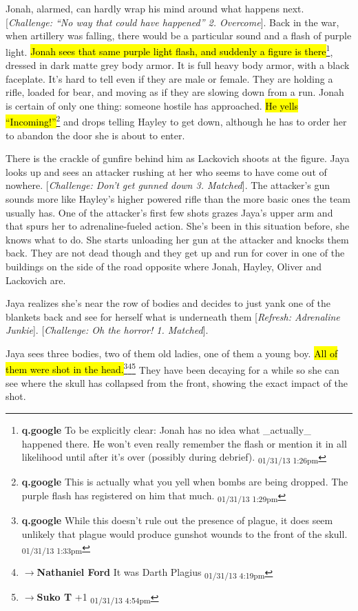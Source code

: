 Jonah, alarmed, can hardly wrap his mind around what happens next. {[}\textit{Challenge: ``No way that could have happened'' 2. Overcome}{]}.  Back in the war, when artillery was falling, there would be a particular sound and a flash of purple light.  \hl{Jonah sees that same purple light flash, and suddenly a figure is there}\footnote{\textbf{q.google }To be explicitly clear: Jonah has no idea what \_actually\_ happened there.  He won't even really remember the flash or mention it in all likelihood until after it's over (possibly during debrief). \textsubscript{01/31/13 1:26pm}}, dressed in dark matte grey body armor.  It is full heavy body armor, with a black faceplate.  It's hard to tell even if they are male or female. They are holding a rifle, loaded for bear, and moving as if they are slowing down from a run.  Jonah is certain of only one thing: someone hostile has approached.  \hl{He yells ``Incoming!''}\footnote{\textbf{q.google }This is actually what you yell when bombs are being dropped.  The purple flash has registered on him that much. \textsubscript{01/31/13 1:29pm}} and drops telling Hayley to get down, although he has to order her to abandon the door she is about to enter.



There is the crackle of gunfire behind him as Lackovich shoots at the figure.  Jaya looks up and sees an attacker rushing at her who seems to have come out of nowhere. {[}\textit{Challenge: Don't get gunned down 3. Matched}{]}.  The attacker's gun sounds more like Hayley's higher powered rifle than the more basic ones the team usually has.  One of the attacker's first few shots grazes Jaya's upper arm and that spurs her to adrenaline-fueled action.  She's been in this situation before, she knows what to do.  She starts unloading her gun at the attacker and knocks them back.  They are not dead though and they get up and run for cover in one of the buildings on the side of the road opposite where Jonah, Hayley, Oliver and Lackovich are.



Jaya realizes she's near the row of bodies and decides to just yank one of the blankets back and see for herself what is underneath them {[}\textit{Refresh: Adrenaline Junkie}{]}.  {[}\textit{Challenge: Oh the horror! 1.  Matched}{]}.  



Jaya sees three bodies, two of them old ladies, one of them a young boy.  \hl{All of them were shot in the head.}\footnote{\textbf{q.google }While this doesn't rule out the presence of plague, it does seem unlikely that plague would produce gunshot wounds to the front of the skull. \textsubscript{01/31/13 1:33pm}}\footnote{$\rightarrow$\textbf{Nathaniel Ford }It was Darth Plagius \textsubscript{01/31/13 4:19pm}}\footnote{$\rightarrow$\textbf{Suko T }+1 \textsubscript{01/31/13 4:54pm}} They have been decaying for a while so she can see where the skull has collapsed from the front, showing the exact impact of the shot.

